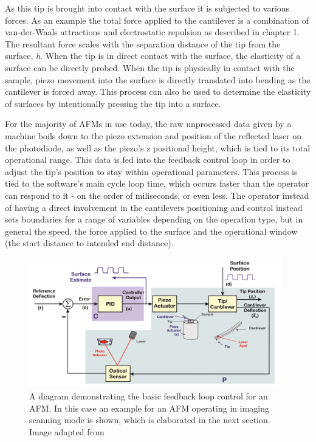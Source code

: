 As this tip is brought into contact with the surface it is subjected to various forces. As an example the total force applied to the cantilever is a combination of van-der-Waals attractions and electrostatic repulsion as described in chapter 1. The resultant force scales with the separation distance of the tip from the surface, \textit{h}. When the tip is in direct contact with the surface, the  elasticity of a surface can be directly probed. When the tip is physically in contact with the sample, piezo movement into the surface is directly translated into bending as the cantilever is forced away. This process can also be used to determine the elasticity of surfaces by intentionally pressing the tip into a surface.

For the majority of AFMs in use today, the raw unprocessed data given by a machine boils down to the piezo extension and position of the reflected laser on the photodiode, as well as the piezo's z positional height, which is tied to its total operational range. This data is fed into the feedback control loop in order to adjust the tip's position to stay within operational parameters. This process is tied to the software's main cycle loop time, which occurs faster than the operator can respond to it - on the order of miliseconds, or even less. The operator instead of having a direct involvement in the cantilevers positioning and control instead sets boundaries for a range of variables depending on the operation type, but in general the speed, the force applied to the surface and the operational window (the start distance to intended end distance).

\begin{figure}[h!]     %
        \begin{center}
          \includegraphics[width=110mm]{chapter2/Feedback.png}
\end{center}
\caption{A diagram demonstrating the basic feedback loop control for an AFM. In this case an example for an AFM operating in imaging scanning mode is shown, which is elaborated in the next section. Image adapted from \cite{AFMTut}}
\label{fig:Feedback}                 %
\end{figure}


